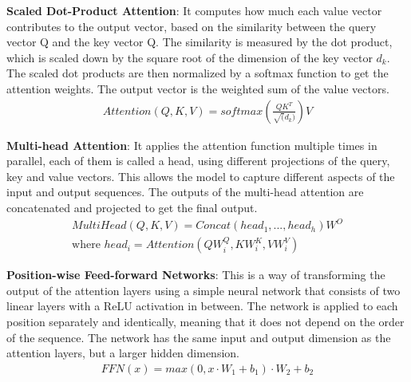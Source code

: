 \textbf{Scaled Dot-Product Attention}: It computes how much each value vector contributes to the output vector, based on the similarity between the query vector Q and the key vector Q. The similarity is measured by the dot product, which is scaled down by the square root of the dimension of the key vector $d_k$. The scaled dot products are then normalized by a softmax function to get the attention weights. The output vector is the weighted sum of the value vectors.
\begin{align}
    Attention (Q,K,V)=softmax(\frac{QK^T}{\sqrt(d_k)})V
\end{align}

\textbf{Multi-head Attention}: It applies the attention function multiple times in parallel, each of them is called a head, using different projections of the query, key and value vectors. This allows the model to capture different aspects of the input and output sequences. The outputs of the multi-head attention are concatenated and projected to get the final output.
\begin{align}
    MultiHead(Q,K,V)= Concat(head_1,...,head_h)W^O\\
    \text{where } head_i=Attention(QW_{i}^Q, KW_{i}^K, VW_{i}^V)
\end{align}

\textbf{Position-wise Feed-forward Networks}: This is a way of transforming the output of the attention layers using a simple neural network that consists of two linear layers with a ReLU activation in between. The network is applied to each position separately and identically, meaning that it does not depend on the order of the sequence. The network has the same input and output dimension as the attention layers, but a larger hidden dimension.
\begin{align}
    FFN(x)=max(0,x\cdot W_1+b_1)\cdot W_2+b_2
\end{align}
